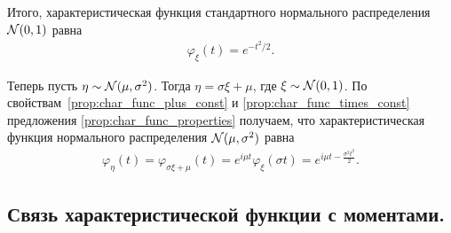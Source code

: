 \documentclass[../main.tex]{subfiles}
\begin{document}
\begin{exmpl}
 Итого, характеристическая функция стандартного нормального распределения $ \mathcal N(0,1) $ равна
 \begin{align*}
  \varphi_\xi(t) = e^{-t^{2} / 2}.
 \end{align*}

 Теперь пусть $ \eta \sim \mathcal N(\mu, \sigma^{2}) $. Тогда $ \eta = \sigma \xi + \mu $, где $ \xi \sim \mathcal N(0,1) $. По свойствам~\ref{prop:char_func_plus_const} и \ref{prop:char_func_times_const} предложения \ref{prop:char_func_properties} получаем, что характеристическая функция нормального распределения $ \mathcal N(\mu,\sigma^{2}) $ равна
 \begin{align*}
  \varphi_\eta(t) = \varphi_{\sigma \xi + \mu}(t) = e^{i \mu t} \varphi_\xi(\sigma t) = e^{i \mu t - \frac{\sigma^{2}t^{2}}{2}}.
 \end{align*}
\end{exmpl}

\subsection{Связь характеристической функции с моментами.}
\end{document}
